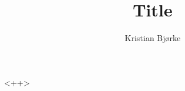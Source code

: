 \documentclass[norsk, a4paper, 11pt]{article}
\title{Title}
\author{Kristian Bjørke}
\begin{document}
<++>
\end{document}
